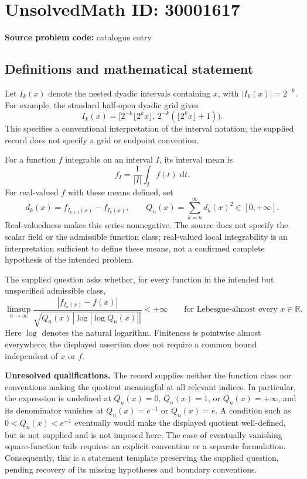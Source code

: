 \documentclass[11pt]{article}
\newcommand{\R}{\mathbb{R}}
\newcommand{\dd}{\,\mathrm{d}}
\begin{document}
\section*{UnsolvedMath ID: 30001617}
\textbf{Source problem code:} catalogue entry
\subsection{Definitions and mathematical statement}
Let \(I_k(x)\) denote the nested dyadic intervals containing \(x\), with \(|I_k(x)|=2^{-k}\). For example, the standard half-open dyadic grid gives
\[
I_k(x)=\bigl[2^{-k}\lfloor 2^kx\rfloor,\,2^{-k}(\lfloor 2^kx\rfloor+1)\bigr).
\]
This specifies a conventional interpretation of the interval notation; the supplied record does not specify a grid or endpoint convention.

For a function \(f\) integrable on an interval \(I\), its interval mean is
\[
f_I=\frac{1}{|I|}\int_I f(t)\,\dd t.
\]
For real-valued \(f\) with these means defined, set
\[
d_k(x)=f_{I_{k+1}(x)}-f_{I_k(x)},\qquad
Q_n(x)=\sum_{k=n}^{\infty}d_k(x)^2\in[0,+\infty].
\]
Real-valuedness makes this series nonnegative. The source does not specify the scalar field or the admissible function class; real-valued local integrability is an interpretation sufficient to define these means, not a confirmed complete hypothesis of the intended problem.

The supplied question asks whether, for every function in the intended but unspecified admissible class,
\[
\limsup_{n\to\infty}
\frac{\left|f_{I_n(x)}-f(x)\right|}
{\sqrt{Q_n(x)\,\left|\log\left|\log Q_n(x)\right|\right|}}
<+\infty
\qquad\text{for Lebesgue-almost every }x\in\R.
\]
Here \(\log\) denotes the natural logarithm. Finiteness is pointwise almost everywhere; the displayed assertion does not require a common bound independent of \(x\) or \(f\).

\textbf{Unresolved qualifications.} The record supplies neither the function class nor conventions making the quotient meaningful at all relevant indices. In particular, the expression is undefined at \(Q_n(x)=0\), \(Q_n(x)=1\), or \(Q_n(x)=+\infty\), and its denominator vanishes at \(Q_n(x)=e^{-1}\) or \(Q_n(x)=e\). A condition such as \(0<Q_n(x)<e^{-1}\) eventually would make the displayed quotient well-defined, but is not supplied and is not imposed here. The case of eventually vanishing square-function tails requires an explicit convention or a separate formulation. Consequently, this is a statement template preserving the supplied question, pending recovery of its missing hypotheses and boundary conventions.
\end{document}

